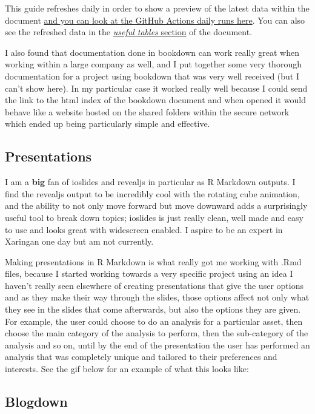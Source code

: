 \documentclass[
]{book}
\begin{document}
This guide refreshes daily in order to show a preview of the latest data within the document \href{https://github.com/ries9112/PredictCryptoDB/actions}{and you can look at the GitHub Actions daily runs here}. You can also see the refreshed data in the \href{https://predictcryptodb-quickstart.com/useful-tables.html}{\emph{useful tables} section} of the document.

I also found that documentation done in bookdown can work really great when working within a large company as well, and I put together some very thorough documentation for a project using bookdown that was very well received (but I can't show here). In my particular case it worked really well because I could send the link to the html index of the bookdown document and when opened it would behave like a website hosted on the shared folders within the secure network which ended up being particularly simple and effective.

\hypertarget{presentations}{%
\subsection{Presentations}\label{presentations}}

I am a \textbf{big} fan of ioslides and revealjs in particular as R Markdown outputs. I find the revealjs output to be incredibly cool with the rotating cube animation, and the ability to not only move forward but move downward adds a surprisingly useful tool to break down topics; ioslides is just really clean, well made and easy to use and looks great with widescreen enabled. I aspire to be an expert in Xaringan one day but am not currently.

Making presentations in R Markdown is what really got me working with .Rmd files, because I started working towards a very specific project using an idea I haven't really seen elsewhere of creating presentations that give the user options and as they make their way through the slides, those options affect not only what they see in the slides that come afterwards, but also the options they are given. For example, the user could choose to do an analysis for a particular asset, then choose the main category of the analysis to perform, then the sub-category of the analysis and so on, until by the end of the presentation the user has performed an analysis that was completely unique and tailored to their preferences and interests. See the gif below for an example of what this looks like:

\hypertarget{blogdown}{%
\subsection{Blogdown}\label{blogdown}}
\end{document}
